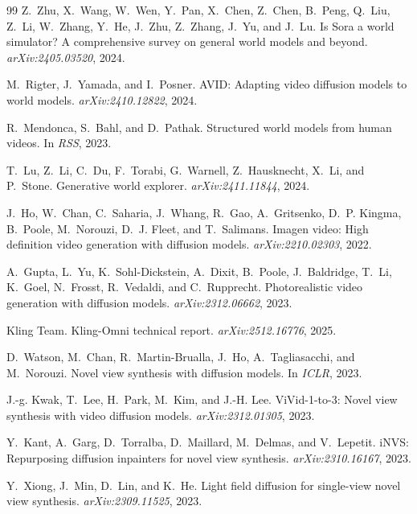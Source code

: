 \begin{thebibliography}{99}
Z.~Zhu, X.~Wang, W.~Wen, Y.~Pan, X.~Chen, Z.~Chen, B.~Peng, Q.~Liu, Z.~Li, W.~Zhang, Y.~He, J.~Zhu, Z.~Zhang, J.~Yu, and J.~Lu.
Is Sora a world simulator? {A} comprehensive survey on general world models and beyond.
\emph{arXiv:2405.03520}, 2024.

M.~Rigter, J.~Yamada, and I.~Posner.
{AVID}: Adapting video diffusion models to world models.
\emph{arXiv:2410.12822}, 2024.

R.~Mendonca, S.~Bahl, and D.~Pathak.
Structured world models from human videos.
In \emph{RSS}, 2023.

T.~Lu, Z.~Li, C.~Du, F.~Torabi, G.~Warnell, Z.~Hausknecht, X.~Li, and P.~Stone.
Generative world explorer.
\emph{arXiv:2411.11844}, 2024.

J.~Ho, W.~Chan, C.~Saharia, J.~Whang, R.~Gao, A.~Gritsenko, D.~P. Kingma, B.~Poole, M.~Norouzi, D.~J. Fleet, and T.~Salimans.
Imagen video: High definition video generation with diffusion models.
\emph{arXiv:2210.02303}, 2022.

A.~Gupta, L.~Yu, K.~Sohl-Dickstein, A.~Dixit, B.~Poole, J.~Baldridge, T.~Li, K.~Goel, N.~Frosst, R.~Vedaldi, and C.~Rupprecht.
Photorealistic video generation with diffusion models.
\emph{arXiv:2312.06662}, 2023.

{Kling Team}.
{Kling-Omni} technical report.
\emph{arXiv:2512.16776}, 2025.

D.~Watson, M.~Chan, R.~Martin-Brualla, J.~Ho, A.~Tagliasacchi, and M.~Norouzi.
Novel view synthesis with diffusion models.
In \emph{ICLR}, 2023.

J.-g. Kwak, T.~Lee, H.~Park, M.~Kim, and J.-H. Lee.
{ViVid-1-to-3}: Novel view synthesis with video diffusion models.
\emph{arXiv:2312.01305}, 2023.

Y.~Kant, A.~Garg, D.~Torralba, D.~Maillard, M.~Delmas, and V.~Lepetit.
{iNVS}: Repurposing diffusion inpainters for novel view synthesis.
\emph{arXiv:2310.16167}, 2023.

Y.~Xiong, J.~Min, D.~Lin, and K.~He.
Light field diffusion for single-view novel view synthesis.
\emph{arXiv:2309.11525}, 2023.


\end{thebibliography}

